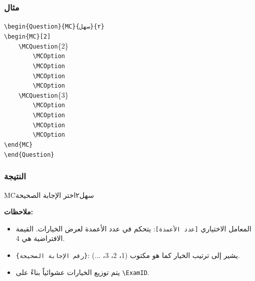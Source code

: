 \documentclass[a4paper]{article}
\newcommand{\engtt}[1]{\textenglish{\texttt{#1}}}
\begin{document}
\subsubsection*{مثال}

\begin{LTR}\ttfamily
\verb|\begin{Question}{MC}{سهل}{٢}|\\
\verb|\begin{MC}[2]|\\
\verb|    \MCQuestion|\{2\}\\
\verb|        \MCOption|\\
\verb|        \MCOption|\\
\verb|        \MCOption|\\
\verb|        \MCOption|\\
\verb|    \MCQuestion|\{3\}\\
\verb|        \MCOption|\\
\verb|        \MCOption|\\
\verb|        \MCOption|\\
\verb|        \MCOption|\\
\verb|\end{MC}|\\
\verb|\end{Question}|
\end{LTR}

\subsubsection*{النتيجة}

\begin{Question}{MC}{سهل}{٢}{اختر الإجابة الصحيحة}
\begin{MC}[2]
\end{MC}
\end{Question}

\textbf{ملاحظات:}
\begin{itemize}
    \item المعامل الاختياري \texttt{[عدد الأعمدة]}: يتحكم في عدد الأعمدة لعرض الخيارات. القيمة الافتراضية هي 4.
    \item \texttt{\{رقم الإجابة الصحيحة\}}: يشير إلى ترتيب الخيار كما هو مكتوب (1، 2، 3، ...).
    \item يتم توزيع الخيارات عشوائياً بناءً على \engtt{\textbackslash ExamID}.
\end{itemize}
\end{document}
